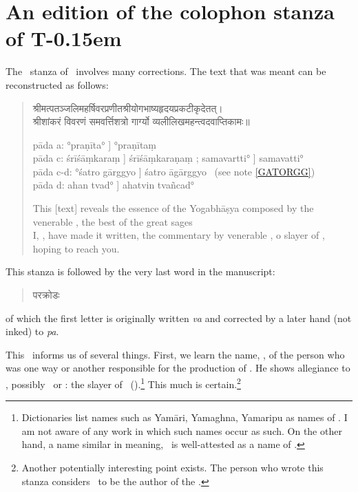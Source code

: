 \section{An edition of the colophon stanza of T\kern -0.15em}\label{TMCOL0405}
The \colophon\ stanza of \Tm\ involves many corrections. The text that was meant can be reconstructed as follows:
\begin{verse}
{\dn श्रीमत्पतञ्जलिमहर्षिवरप्रणीतश्रीयोगभाष्यहृदयप्रकटीकृदेतत्।\\
	श्रीशांकरं विवरणं समवर्त्तिशत्रो गार्ग्यो व्यलीलिखमहन्त्वदवाप्तिकामः॥} %

{\footnotesize 
pāda a: °praṇīta° \Tmpc] °praṇītaṃ \Tmac\\
pāda c: śrīśāṃkaraṃ \Tmpc] śrīśāṃkaraṇaṃ \Tmac; 
        samavartti° \Tmpc] samavatti° \Tmac\\
pāda c-d: °śatro gārggyo \Tmac]  śatro ā\cce \ins gā\ine rggyo \Tm\ (see note \ref{GATORGG})\\
pāda d: ahan tvad° \Tmpc] aha\ccs tvi\cce \ins n tva\ine\ccs ñca\cce d° \Tm

}

This [text] reveals the essence of the Yogabhāṣya composed by the venerable \Patanjali, the best of the great sages \\
I, \Gargya, have made it written, the commentary by venerable \Sankara, o slayer of \Samavartin, hoping to reach you.
\end{verse}
This stanza is followed by the very last word in the manuscript:
\begin{quote}
{\dn परक्रोडः}
\end{quote}
of which the first letter is originally written \emph{va} and corrected by a later hand (not inked) to \emph{pa}.

This \colophon\ informs us of several things. First, we learn the name, \Gargya, of the person who was one way or another responsible for the production of \Tm. He shows allegiance to \Samavartisatru, possibly \Visnu\ or \Siva: the slayer of \Samavartin\ (\Yama).\footnote{Dictionaries list names such as Yamāri, Yamaghna, Yamaripu as names of \Visnu. I am not aware of any work in which such names occur as such. On the other hand, a name similar in meaning, \Yamantaka\ is well-attested as a name of \Siva.} This much is certain.\footnote{Another potentially interesting point exists. The person who wrote this stanza considers \Patanjali\ to be the author of the \Yogabhasya.} 

